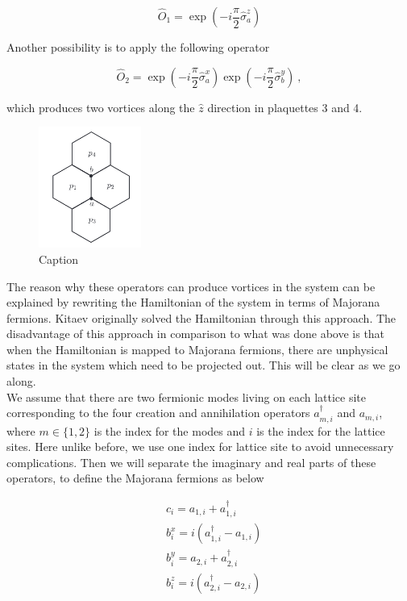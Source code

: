 \documentclass{article}
\begin{document}
\begin{equation}\label{eq:18}
    \hat{O}_1 = \exp{(-i\frac{\pi}{2}\hat{\sigma}^{z}_a)}
\end{equation}{}

Another possibility is to apply the following operator 

\begin{equation}\label{eq:19}
    \hat{O}_2 = \exp{(-i\frac{\pi}{2}\hat{\sigma}^{x}_a)}\exp{(-i\frac{\pi}{2}\hat{\sigma}^{y}_b)}~,
\end{equation}{}

which produces two vortices along the $\hat{z}$ direction in plaquettes 3 and 4.

\begin{figure}[!htb]
    \centering
    \includegraphics[width=0.3\textwidth]{./images/anyons.png}
    \caption{Caption}
    \label{fig:anyons}
\end{figure}{}

The reason why these operators can produce vortices in the system can be explained by rewriting the Hamiltonian of the system in terms of Majorana fermions. Kitaev originally solved the Hamiltonian through this approach. The disadvantage of this approach in comparison to what was done above is that when the Hamiltonian is mapped to Majorana fermions, there are unphysical states in the system which need to be projected out. This will be clear as we go along.\\

We assume that there are two fermionic modes living on each lattice site corresponding to the four creation and annihilation operators $a^\dagger_{m,i}$ and $a_{m,i}$, where $m\in \{1,2\}$ is the index for the modes and $i$ is the index for the lattice sites. Here unlike before, we use one index for lattice site to avoid unnecessary complications. Then we will separate the imaginary and real parts of these operators, to define the Majorana fermions as below

\begin{equation}\label{eq:20}
    \begin{aligned}
        & c_i = a_{1,i} + a^\dagger_{1,i} \\
        & b^x_i = i(a^\dagger_{1,i} - a_{1,i}) \\
        & b^y_i = a_{2,i} + a^\dagger_{2,i} \\
        & b^z_i = i(a^\dagger_{2,i} - a_{2,i})
    \end{aligned}
\end{equation}{}\\
\end{document}
